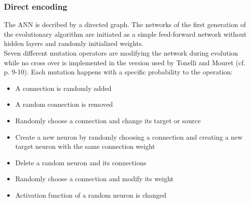 \documentclass[12pt,twoside]{article}
\theoremstyle{plain}
\theoremstyle{definition}
\theoremstyle{remark}
\begin{document}
\subsubsection{Direct encoding}
The ANN is decribed by a directed graph. The networks of the first generation of the evolutionary algorithm are initiated as a simple feed-forward network without hidden layers and randomly initialized weights.\\
Seven different mutation operators are modifying the network during evolution while no cross over is implemented in the version used by Tonelli and Mouret (cf. \cite{citeulike:12788284} p. 9-10).
Each mutation happens with a specific probability to the operation:
\begin{itemize}
	\item A connection is randomly added
	\item A random connection is removed
	\item Randomly choose a connection and change its target or source
	\item Create a new neuron by randomly choosing a connection and creating a new target neuron with the same connection weight
	\item Delete a random neuron and its connections
	\item Randomly choose a connection and modify its weight
	\item Activation function of a random neuron is changed
\end{itemize}
\end{document}

